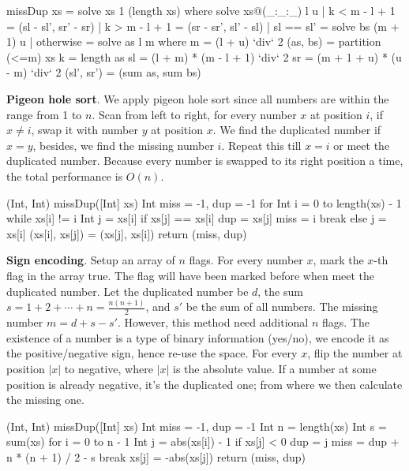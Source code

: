 \documentclass[b5paper]{article}
\begin{document}
\begin{Answer}[ref={ex:preface}]
{\begin{Haskell}
missDup xs = solve xs 1 (length xs) where
  solve xs@(_:_:_) l u | k < m - l + 1 = (sl - sl', sr' - sr)
                       | k > m - l + 1 = (sr - sr', sl' - sl)
                       | sl == sl' = solve bs (m + 1) u
                       | otherwise = solve as l m
    where
      m = (l + u) `div` 2
      (as, bs) = partition (<=m) xs
      k = length as
      sl = (l + m) * (m - l + 1) `div` 2
      sr = (m + 1 + u) * (u - m) `div` 2
      (sl', sr') = (sum as, sum bs)
\end{Haskell}

\textbf{Pigeon hole sort}. We apply pigeon hole sort since all numbers are within the range from 1 to $n$. Scan from left to right, for every number $x$ at position $i$, if $x \neq i$, swap it with number $y$ at position $x$. We find the duplicated number if $x = y$, besides, we find the missing number $i$. Repeat this till $x = i$ or meet the duplicated number. Because every number is swapped to its right position a time, the total performance is $O(n)$.

\begin{Bourbaki}
(Int, Int) missDup([Int] xs) {
    Int miss = -1, dup = -1
    for Int i = 0 to length(xs) - 1 {
        while xs[i] != i {
            Int j = xs[i]
            if xs[j] == xs[i] {
                dup = xs[j]
                miss = i
                break
            } else {
                j = xs[i]
                (xs[i], xs[j]) = (xs[j], xs[i])
            }
        }
    }
    return (miss, dup)
}
\end{Bourbaki}

\textbf{Sign encoding}. Setup an array of $n$ flags. For every number $x$, mark the $x$-th flag in the array true. The flag will have been marked before when meet the duplicated number. Let the duplicated number be $d$, the sum $s = 1 + 2 + \dotsb + n = \frac{n (n + 1)}{2}$, and $s'$ be the sum of all numbers. The missing number $m = d + s - s'$. However, this method need additional $n$ flags. The existence of a number is a type of binary information (yes/no), we encode it as the positive/negative sign, hence re-use the space. For every $x$, flip the number at position $|x|$ to negative, where $|x|$ is the absolute value. If a number at some position is already negative, it's the duplicated one; from where we then calculate the missing one.

\begin{Bourbaki}
(Int, Int) missDup([Int] xs) {
    Int miss = -1, dup = -1
    Int n = length(xs)
    Int s = sum(xs)
    for i = 0 to n - 1 {
        Int j = abs(xs[i]) - 1
        if xs[j] < 0 {
            dup = j
            miss = dup + n * (n + 1) / 2 - s
            break
        }
        xs[j] = -abs(xs[j])
    }
    return (miss, dup)
}
\end{Bourbaki}

}
\end{Answer}
\end{document}
